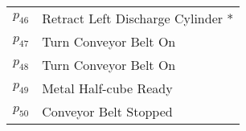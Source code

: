 \begin{table}[H]
\begin{tabular}{M{5cm}M{10cm}}
\hyperlink{partialNet:p461}{\hypertarget{partialTable:p46}{$p_{46}$}} & Retract Left Discharge Cylinder *\\
\hyperlink{partialNet:p471}{\hypertarget{partialTable:p47}{$p_{47}$}} & Turn Conveyor Belt On\\
\hyperlink{partialNet:p481}{\hypertarget{partialTable:p48}{$p_{48}$}} & Turn Conveyor Belt On\\
\hyperlink{partialNet:p491}{\hypertarget{partialTable:p49}{$p_{49}$}} & Metal Half-cube Ready\\
\hyperlink{partialNet:p501}{\hypertarget{partialTable:p50}{$p_{50}$}} & Conveyor Belt Stopped\\
\end{tabular}
\end{table}
